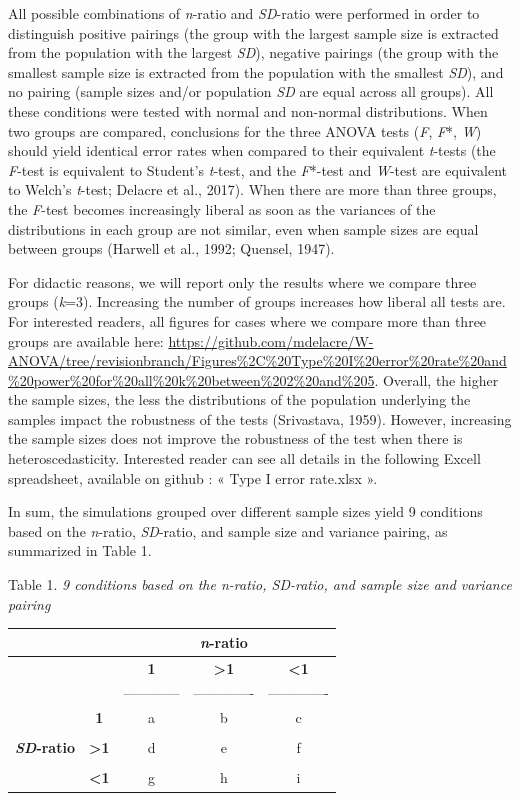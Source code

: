 \documentclass[man,floatsintext]{apa6}
\begin{document}
All possible combinations of \emph{n}-ratio and \emph{SD}-ratio were performed in order to distinguish positive pairings (the group with the largest sample size is extracted from the population with the largest \emph{SD}), negative pairings (the group with the smallest sample size is extracted from the population with the smallest \emph{SD}), and no pairing (sample sizes and/or population \emph{SD} are equal across all groups). All these conditions were tested with normal and non-normal distributions. When two groups are compared, conclusions for the three ANOVA tests (\emph{F}, \emph{F}*, \emph{W}) should yield identical error rates when compared to their equivalent \emph{t}-tests (the \emph{F}-test is equivalent to Student's \emph{t}-test, and the \emph{F}*-test and \emph{W}-test are equivalent to Welch's \emph{t}-test; Delacre et al., 2017). When there are more than three groups, the \emph{F}-test becomes increasingly liberal as soon as the variances of the distributions in each group are not similar, even when sample sizes are equal between groups (Harwell et al., 1992; Quensel, 1947).

For didactic reasons, we will report only the results where we compare three groups (\emph{k}=3). Increasing the number of groups increases how liberal all tests are. For interested readers, all figures for cases where we compare more than three groups are available here: \url{https://github.com/mdelacre/W-ANOVA/tree/revisionbranch/Figures\%2C\%20Type\%20I\%20error\%20rate\%20and\%20power\%20for\%20all\%20k\%20between\%202\%20and\%205}. Overall, the higher the sample sizes, the less the distributions of the population underlying the samples impact the robustness of the tests (Srivastava, 1959). However, increasing the sample sizes does not improve the robustness of the test when there is heteroscedasticity. Interested reader can see all details in the following Excell spreadsheet, available on github : « Type I error rate.xlsx ».

In sum, the simulations grouped over different sample sizes yield 9 conditions based on the \emph{n}-ratio, \emph{SD}-ratio, and sample size and variance pairing, as summarized in Table 1.

Table 1.
\emph{9 conditions based on the n-ratio, SD-ratio, and sample size and variance pairing}

\begin{longtable}[]{@{}ccccc@{}}
\toprule
& & & \textbf{\emph{n}-ratio} &\tabularnewline
\midrule
\endhead
& & \textbf{1} & \textbf{\textgreater{}1} & \textbf{\textless{}1}\tabularnewline
& & ------------ & ------------- & -------------\tabularnewline
& \textbf{1} & a & b & c\tabularnewline
& & & &\tabularnewline
\textbf{\emph{SD}-ratio} & \textbf{\textgreater{}1} & d & e & f\tabularnewline
& & & &\tabularnewline
& \textbf{\textless{}1} & g & h & i\tabularnewline
\bottomrule
\end{longtable}
\end{document}

